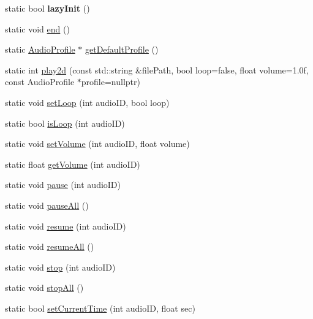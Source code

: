 \begin{DoxyCompactItemize}
\item 
\mbox{\label{classexperimental_1_1AudioEngine_a52024f30bece9adf911e6cf140d47bfe}} 
static bool {\bfseries lazy\+Init} ()
\item 
static void \hyperlink{classexperimental_1_1AudioEngine_a17ea6cda24d6c4d951d5b60b6d2afca0}{end} ()
\item 
static \hyperlink{classexperimental_1_1AudioProfile}{Audio\+Profile} $\ast$ \hyperlink{classexperimental_1_1AudioEngine_a0579fbcef062480d4de9edf98857cf12}{get\+Default\+Profile} ()
\item 
static int \hyperlink{classexperimental_1_1AudioEngine_ae7693b0ea2b5f2334153ebdf7ccb93d2}{play2d} (const std\+::string \&file\+Path, bool loop=false, float volume=1.\+0f, const Audio\+Profile $\ast$profile=nullptr)
\item 
static void \hyperlink{classexperimental_1_1AudioEngine_a4d9aa8312f064b9bcdc06888c4306c23}{set\+Loop} (int audio\+ID, bool loop)
\item 
static bool \hyperlink{classexperimental_1_1AudioEngine_a7a636855b8bd54af196a9f6947791d3b}{is\+Loop} (int audio\+ID)
\item 
static void \hyperlink{classexperimental_1_1AudioEngine_a6759e7f6b0e2da64523949cf361a083e}{set\+Volume} (int audio\+ID, float volume)
\item 
static float \hyperlink{classexperimental_1_1AudioEngine_ab6545ae46e79147482bb50861c91e5e9}{get\+Volume} (int audio\+ID)
\item 
static void \hyperlink{classexperimental_1_1AudioEngine_a1989c81a914d8f927c4f2decfacd3a96}{pause} (int audio\+ID)
\item 
static void \hyperlink{classexperimental_1_1AudioEngine_a3d08304458bf45967020a9ab00e91eb3}{pause\+All} ()
\item 
static void \hyperlink{classexperimental_1_1AudioEngine_aa45189f10c2113f68728ee2157e8eb55}{resume} (int audio\+ID)
\item 
static void \hyperlink{classexperimental_1_1AudioEngine_a8618e28e77cfeebe8cf6b2798ae90ae9}{resume\+All} ()
\item 
static void \hyperlink{classexperimental_1_1AudioEngine_a932422ecf6818ac5e81e4530e556fd1e}{stop} (int audio\+ID)
\item 
static void \hyperlink{classexperimental_1_1AudioEngine_a911b9b9c56cf769fd561334870533d13}{stop\+All} ()
\item 
static bool \hyperlink{classexperimental_1_1AudioEngine_aa61e7a0b9ad959c203944ad701486dab}{set\+Current\+Time} (int audio\+ID, float sec)

\end{DoxyCompactItemize}
